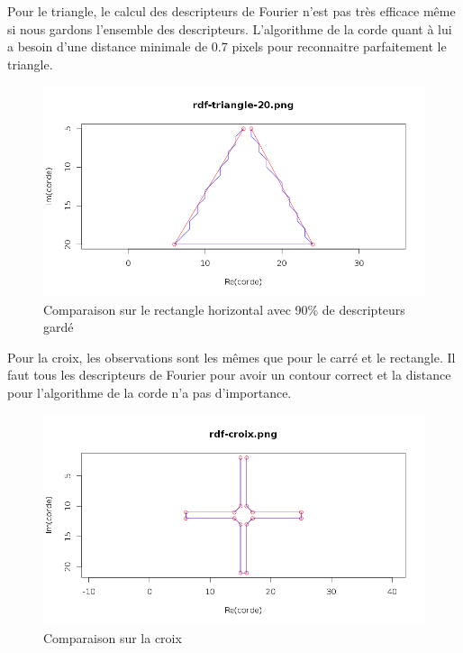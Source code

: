 \documentclass[11pt]{article}
\begin{document}
  Pour le triangle, le calcul des descripteurs de Fourier n'est pas très efficace même si nous gardons
  l'ensemble des descripteurs. L'algorithme de la corde quant à lui a besoin d'une distance minimale de 0.7 pixels pour
  reconnaitre parfaitement le triangle.
  
  \begin{center}
    \begin{figure}[!h]
      \includegraphics[width=15cm]{../resultat/comp_triangle.png}
      \caption{Comparaison sur le rectangle horizontal avec 90\% de descripteurs gardé}
    \end{figure}
  \end{center}
  
  \newpage
  
  Pour la croix, les observations sont les mêmes que pour le carré et le rectangle. Il faut tous
  les descripteurs de Fourier pour avoir un contour correct et la distance pour l'algorithme de la
  corde n'a pas d'importance.
  
  \begin{center}
    \begin{figure}[!h]
      \includegraphics[width=15cm]{../resultat/comp_croix.png}
      \caption{Comparaison sur la croix}
    \end{figure}
  \end{center}
  
\end{document}
